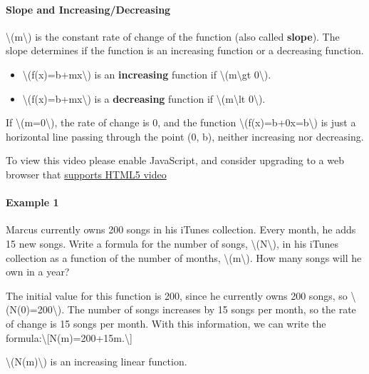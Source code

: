 \hypertarget{slope-and-increasingdecreasing}{%
\paragraph{Slope and
Increasing/Decreasing}\label{slope-and-increasingdecreasing}}

\textbackslash{}(m\textbackslash{}) is the constant rate of change of
the function (also called \textbf{slope}). The slope determines if the
function is an increasing function or a decreasing function.

\begin{itemize}
\tightlist
\item
  \textbackslash{}(f(x)=b+mx\textbackslash{}) is an \textbf{increasing}
  function if \textbackslash{}(m\textbackslash{}gt 0\textbackslash{}).
\item
  \textbackslash{}(f(x)=b+mx\textbackslash{}) is a \textbf{decreasing}
  function if \textbackslash{}(m\textbackslash{}lt 0\textbackslash{}).
\end{itemize}

If \textbackslash{}(m=0\textbackslash{}), the rate of change is 0, and
the function \textbackslash{}(f(x)=b+0x=b\textbackslash{}) is just a
horizontal line passing through the point (0, b), neither increasing nor
decreasing.

To view this video please enable JavaScript, and consider upgrading to a
web browser that \href{http://videojs.com/html5-video-support/}{supports
HTML5 video}

\hypertarget{example-1}{%
\paragraph{Example 1}\label{example-1}}

Marcus currently owns 200 songs in his iTunes collection. Every month,
he adds 15 new songs. Write a formula for the number of songs,
\textbackslash{}(N\textbackslash{}), in his iTunes collection as a
function of the number of months, \textbackslash{}(m\textbackslash{}).
How many songs will he own in a year?

The initial value for this function is 200, since he currently owns 200
songs, so \textbackslash{}(N(0)=200\textbackslash{}). The number of
songs increases by 15 songs per month, so the rate of change is 15 songs
per month. With this information, we can write the
formula:\textbackslash{}{[}N(m)=200+15m.\textbackslash{}{]}

\textbackslash{}(N(m)\textbackslash{}) is an increasing linear function.

